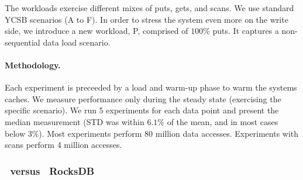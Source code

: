 The workloads exercise different mixes of puts, gets, and scans. We use standard YCSB scenarios 
(A to F). %
In order to stress the system even more on the write side, we introduce a new workload,  
P, comprised of $100\%$ puts. It captures a non-sequential data load scenario. 

\paragraph{Methodology.} Each experiment is preceeded by a load and warm-up phase  to warm the systems caches.
We measure performance only during the steady state (exercising the specific scenario). We run 5 experiments for each data point and present the median measurement (STD was within $6.1\%$ 
of the mean, and in most cases below $3\%$).  
Most experiments  perform 80 million data accesses. Experiments with scans perform 4 million accesses.




\subsubsection{\sys\ versus \ RocksDB}
\label{ssec:results} 

